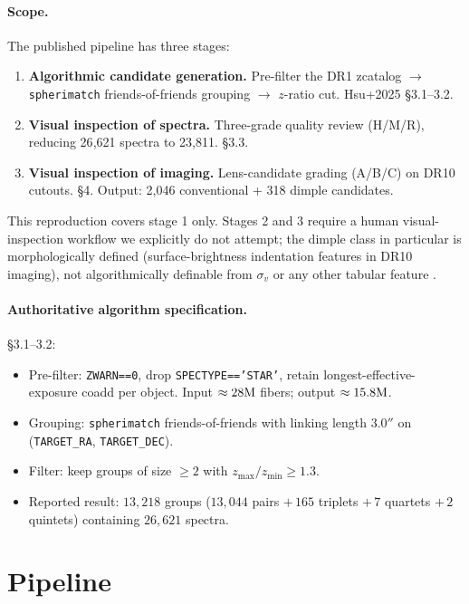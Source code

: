 \documentclass[11pt,letterpaper]{article}
\newcommand{\sigmav}{\ensuremath{\sigma_v}}
\begin{document}
\paragraph{Scope.} The published pipeline has three stages:
\begin{enumerate}
\item \textbf{Algorithmic candidate generation.} Pre-filter the DR1
      zcatalog $\to$ \texttt{spherimatch} friends-of-friends grouping
      $\to$ $z$-ratio cut. Hsu+2025 \S3.1--3.2.
\item \textbf{Visual inspection of spectra.} Three-grade quality
      review (H/M/R), reducing 26{,}621 spectra to 23{,}811. \S3.3.
\item \textbf{Visual inspection of imaging.} Lens-candidate grading
      (A/B/C) on DR10 cutouts. \S4. Output: 2{,}046 conventional + 318
      dimple candidates.
\end{enumerate}
This reproduction covers stage 1 only. Stages 2 and 3 require a human
visual-inspection workflow we explicitly do not attempt; the dimple
class in particular is morphologically defined (surface-brightness
indentation features in DR10 imaging), not algorithmically definable
from $\sigmav$ or any other tabular feature
\autocite[Fig.~6 caption]{hsu2025pairwise}.

\paragraph{Authoritative algorithm specification.}
\citet{hsu2025pairwise} \S3.1--3.2:
\begin{itemize}
\item Pre-filter: \texttt{ZWARN==0}, drop \texttt{SPECTYPE=='STAR'},
      retain longest-effective-exposure coadd per object. Input
      $\approx 28{\rm M}$ fibers; output $\approx 15.8{\rm M}$.
\item Grouping: \texttt{spherimatch} \autocite{spherimatch}
      friends-of-friends with linking length $3.0''$ on
      (\texttt{TARGET\_RA}, \texttt{TARGET\_DEC}).
\item Filter: keep groups of size $\geq 2$ with $z_{\max}/z_{\min}
      \geq 1.3$.
\item Reported result: $13{,}218$ groups
      ($13{,}044$ pairs $+\,165$ triplets $+\,7$ quartets
      $+\,2$ quintets) containing $26{,}621$ spectra.
\end{itemize}

\section{Pipeline}
\end{document}
